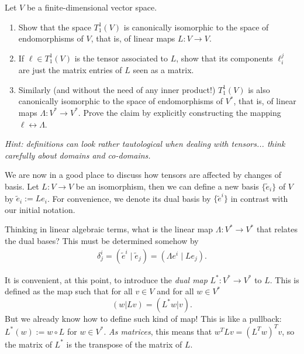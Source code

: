\begin{exercise}\label{exe:iso_vs_endo}
	Let $V$ be a finite-dimensional vector space.
	\begin{enumerate}
		\item Show that the space $T^1_1(V)$ is canonically isomorphic to the space of endomorphisms of $V$, that is, of linear maps $L:V\to V$.

		\item If $\ell\in T^1_1(V)$ is the tensor associated to $L$, show that its components $\ell_i^j$ are just the matrix entries of $L$ seen as a matrix.

		\item Similarly (and without the need of any inner product!) $T^1_1(V)$ is also canonically isomorphic to the space of endomorphisms of $V^*$, that is, of linear maps $\Lambda:V^*\to V^*$.
		      Prove the claim by explicitly constructing the mapping $\ell \leftrightarrow \Lambda$.
	\end{enumerate}
	\textit{\small Hint: definitions can look rather tautological when dealing with tensors... think carefully about domains and co-domains.}
\end{exercise}

We are now in a good place to discuss how tensors are affected by changes of basis.
Let $L: V\to V$ be an isomorphism, then we can define a new basis $\{\widetilde e_i\}$ of $V$ by $\widetilde e_i := L e_i$. For convenience, we denote its dual basis by $\{\widetilde e^i\}$ in contrast with our initial notation.

Thinking in linear algebraic terms, what is the linear map $\Lambda:V^*\to V^*$ that relates the dual bases? This must be determined somehow by
\begin{align}\label{eq:vs_ch_bases}
	\delta^i_j = (\widetilde e^i \mid \widetilde e_j) = (\Lambda e^i \mid L e_j).
\end{align}

It is convenient, at this point, to introduce the \emph{dual map} $L^* : V^* \to V^*$ to $L$.
This is defined as the map such that for all $v\in V$ and for all $w\in V^*$
\begin{equation}\label{eq:dualmap}
	(w | Lv) = (L^* w | v).
\end{equation}
But we already know how to define such kind of map! This is like a pullback: $L^*(w) := w \circ L$ for $w\in V^*$.
\emph{As matrices}, this means that $w^T L v = (L^T w)^T v$, so the matrix of $L^*$ is the transpose of the matrix of $L$.

